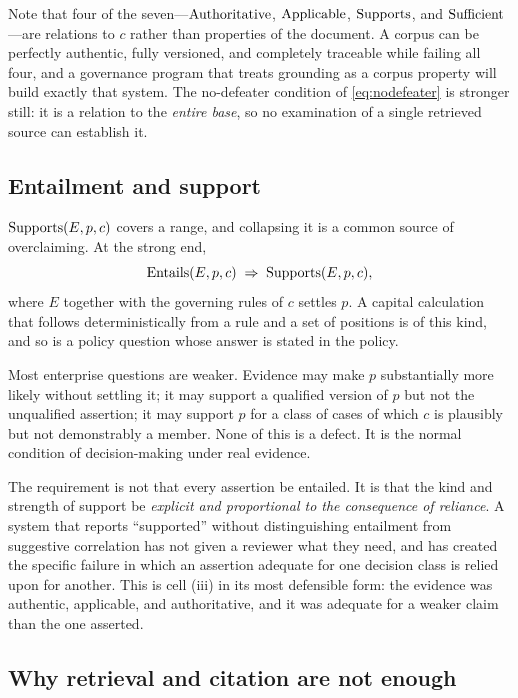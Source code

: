 Note that four of the seven---$\operatorname{Authoritative}$, $\operatorname{Applicable}$, $\operatorname{Supports}$, and
$\operatorname{Sufficient}$---are relations to $c$ rather than properties of the document. A corpus
can be perfectly authentic, fully versioned, and completely traceable while failing
all four, and a governance program that treats grounding as a corpus property will
build exactly that system. The no-defeater condition of \eqref{eq:nodefeater} is
stronger still: it is a relation to the \emph{entire base}, so no examination of a
single retrieved source can establish it.

\subsection{Entailment and support}
\label{sec:entails-supports}

$\operatorname{Supports}(E, p, c)$ covers a range, and collapsing it is a common source of
overclaiming. At the strong end,
\begin{equation}
  \operatorname{Entails}(E, p, c) \;\Rightarrow\; \operatorname{Supports}(E, p, c),
  \label{eq:entails}
\end{equation}
where $E$ together with the governing rules of $c$ settles $p$. A capital
calculation that follows deterministically from a rule and a set of positions is of
this kind, and so is a policy question whose answer is stated in the policy.

Most enterprise questions are weaker. Evidence may make $p$ substantially more
likely without settling it; it may support a qualified version of $p$ but not the
unqualified assertion; it may support $p$ for a class of cases of which $c$ is
plausibly but not demonstrably a member. None of this is a defect. It is the normal
condition of decision-making under real evidence.

The requirement is not that every assertion be entailed. It is that the kind and
strength of support be \emph{explicit and proportional to the consequence of
reliance}. A system that reports ``supported'' without distinguishing entailment
from suggestive correlation has not given a reviewer what they need, and has
created the specific failure in which an assertion adequate for one decision class
is relied upon for another. This is cell (iii) in its most defensible form: the
evidence was authentic, applicable, and authoritative, and it was adequate for a
weaker claim than the one asserted.

\subsection{Why retrieval and citation are not enough}
\label{sec:retrieval-insufficient}

